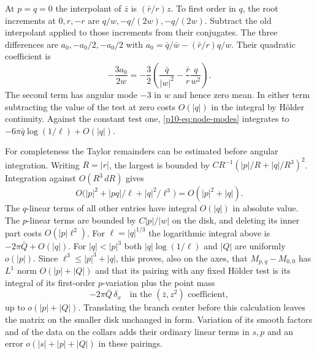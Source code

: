 At $p=q=0$ the interpolant of $\bar z$ is $(\bar r/r)z$. To first
order in $q$, the root increments at $0,r,-r$ are $q/w,-q/(2w),-q/(2w)$.
Subtract the old interpolant applied to those increments from their
conjugates. The three differences are $a_0,-a_0/2,-a_0/2$ with
$a_0=\bar q/\bar w-(\bar r/r)q/w$. Their quadratic coefficient is
\begin{equation}\label{p10-eq:node-modes}
            -\frac{3a_0}{2w}=-\frac32\left(
                 \frac{\bar q}{|w|^2}-\frac{\bar r}{r}\frac{q}{w^2}
                              \right).
\end{equation}
The second term has angular mode $-3$ in $w$ and hence zero mean. In
either term subtracting the value of the test at zero costs $O(|q|)$
in the integral by H\"older continuity. Against the constant test one,
\eqref{p10-eq:node-modes} integrates to
$-6\pi\bar q\log(1/\ell)+O(|q|)$.

For completeness the Taylor remainders can be estimated before angular
integration. Writing $R=|r|$, the largest is bounded by
$C R^{-1}(|p|/R+|q|/R^3)^2$. Integration against $O(R^3\,dR)$ gives
\[
       O\bigl(|p|^2+|pq|/\ell+|q|^2/\ell^3\bigr)
                        =O(|p|^2+|q|).
\]
The $q$-linear terms of all other entries have integral $O(|q|)$ in
absolute value. The $p$-linear terms are bounded by $C|p|/|w|$ on
the disk, and deleting its inner part costs $O(|p|\ell^2)$. For
$\ell=|q|^{1/3}$ the logarithmic integral above is $-2\pi\bar Q+O(|q|)$.
For $|q|<|p|^3$ both $|q|\log(1/\ell)$ and $|Q|$ are uniformly
$o(|p|)$. Since $\ell^3\le |p|^3+|q|$, this proves, also on the axes,
that $M_{p,q}-M_{0,0}$ has $L^1$ norm $O(|p|+|Q|)$ and that its
pairing with any fixed H\"older test is its integral of its first-order
$p$-variation plus the point mass
\begin{equation}\label{p10-eq:node-mass}
              -2\pi\bar Q\,\delta_x
         \quad\text{in the }(\bar z,z^2)\text{ coefficient},
\end{equation}
up to $o(|p|+|Q|)$. Translating the branch center before this
calculation leaves the matrix on the smaller disk unchanged in form.
Variation of its smooth factors and of the data on the collars adds
their ordinary linear terms in $s,p$ and an error
$o(|s|+|p|+|Q|)$ in these pairings.

